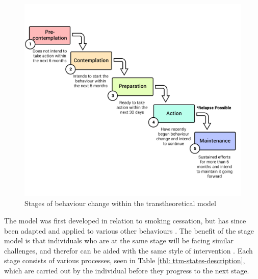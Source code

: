 \begin{figure}[h]
    \centering
    \includegraphics[scale=0.16, angle=0]{Files/prevention-study-1/figures/ttm-stages-model}
    \caption{Stages of behaviour change within the transtheoretical model}
    \label{fig: ttm-model}
\end{figure}


The model was first developed in relation to smoking cessation, but has since been adapted and applied to various other behaviours \cite{Nisbet2008}. The benefit of the stage model is that individuals who are at the same stage will be facing similar challenges, and therefor can be aided with the same style of intervention \cite{Morris2012a}. Each stage consists of various processes, seen in Table \ref{tbl: ttm-states-description}, which are carried out by the individual before they progress to the next stage.

